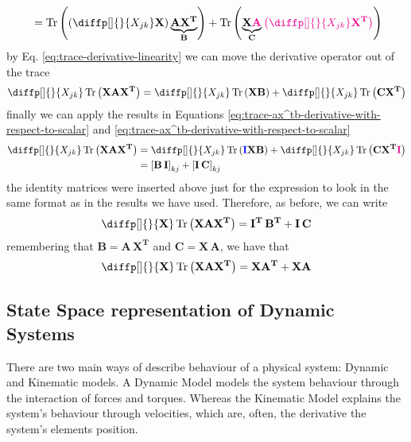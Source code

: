 \documentclass[12pt]{article}
\newcommand{\mat}[1]{\boldsymbol{\mathbf{#1}}}
\newcommand{\brac}[1]{\left[#1\right]} %
\newcommand{\parentheses}[1]{\left(#1\right)}
\DeclareMathOperator{\Tr}{Tr}
\newcommand{\blue}[1]{\color{blue}#1\color{black}}
\newcommand{\magenta}[1]{\color{magenta}#1\color{black}}
\begin{document}
\begin{enumerate}
\begin{equation*}
\begin{aligned}
            &= \Tr\parentheses{\parentheses{\diffp[]{}{X_{jk}} \mat{X}} \underbrace{\mat{A X^T}}_{\mat{B}}} + \Tr\parentheses{\underbrace{\mat{X \magenta{A}}}_{\mat{C}}\magenta{\parentheses{\diffp[]{}{X_{jk}} \mat{X^T}}}}\\
        \end{aligned}
    \end{equation*}
    by Eq. \ref{eq:trace-derivative-linearity} we can move the derivative operator out of the trace
    \begin{equation*}
        \diffp[]{}{X_{jk}} \Tr\parentheses{\mat{X A X^T}} = \diffp[]{}{X_{jk}} \Tr\parentheses{\mat{X B}} + \diffp[]{}{X_{jk}}\Tr\parentheses{\mat{C X^T}}
    \end{equation*}
    finally we can apply the results in Equations \ref{eq:trace-ax^tb-derivative-with-respect-to-scalar} and \ref{eq:trace-ax^tb-derivative-with-respect-to-scalar}
    \begin{equation*}
        \begin{aligned}
        \diffp[]{}{X_{jk}} \Tr\parentheses{\mat{X A X^T}} &= \diffp[]{}{X_{jk}} \Tr\parentheses{\mat{\blue{I} X B}} + \diffp[]{}{X_{jk}}\Tr\parentheses{\mat{C X^T \magenta{I}}} \\
        &= \brac{\mat{B\,I}}_{kj} + \brac{\mat{I\,C}}_{kj}
        \end{aligned}
    \end{equation*}
    the identity matrices were inserted above just for the expression to look in the same format as in the results we have used. Therefore, as before, we can write
    \begin{equation*}
        \diffp[]{}{\mat{X}} \Tr\parentheses{\mat{X A X^T}} = \mat{I^T \, B^T} + \mat{I\, C}
    \end{equation*}
    remembering that $\mat{B} = \mat{A\,X^T}$ and $\mat{C} = \mat{X \, A}$, we have that
    \begin{equation}
        \diffp[]{}{\mat{X}} \Tr\parentheses{\mat{X A X^T}} = \mat{X A^T} + \mat{X A}
        \label{eq:trace-xax^t-derivative}
    \end{equation}
\end{enumerate}


\subsection{State Space representation of Dynamic Systems}
There are two main ways of describe behaviour of a physical system: Dynamic and Kinematic models. A Dynamic Model models the system behaviour through the interaction of forces and torques. Whereas the Kinematic Model explains the system's behaviour through velocities, which are, often, the derivative the system's elements position.
\end{document}
